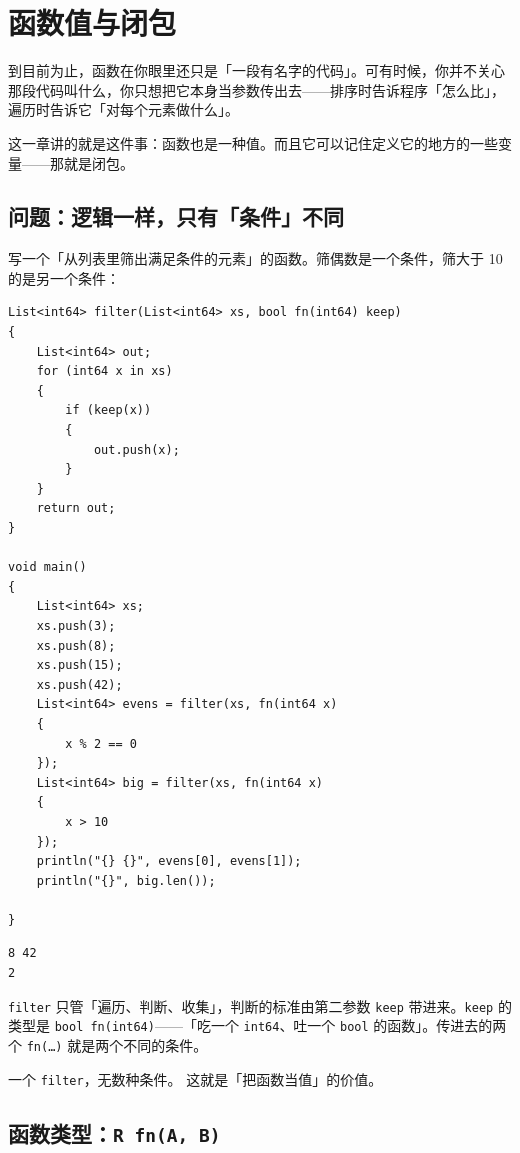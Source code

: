 \chapter{函数值与闭包}
\label{ch:15}

到目前为止，函数在你眼里还只是「一段有名字的代码」。可有时候，你并不关心那段代码叫什么，你只想把它本身当参数传出去——排序时告诉程序「怎么比」，遍历时告诉它「对每个元素做什么」。

这一章讲的就是这件事：函数也是一种值。而且它可以记住定义它的地方的一些变量——那就是闭包。

\section{问题：逻辑一样，只有「条件」不同}

写一个「从列表里筛出满足条件的元素」的函数。筛偶数是一个条件，筛大于 10 的是另一个条件：

\par
\medskip
\begin{lstlisting}[style=chali]
List<int64> filter(List<int64> xs, bool fn(int64) keep)
{
    List<int64> out;
    for (int64 x in xs)
    {
        if (keep(x))
        {
            out.push(x);
        }
    }
    return out;
}

void main()
{
    List<int64> xs;
    xs.push(3);
    xs.push(8);
    xs.push(15);
    xs.push(42);
    List<int64> evens = filter(xs, fn(int64 x)
    {
        x % 2 == 0
    });
    List<int64> big = filter(xs, fn(int64 x)
    {
        x > 10
    });
    println("{} {}", evens[0], evens[1]);
    println("{}", big.len());

}
\end{lstlisting}
\par
\medskip

\par
\medskip
\begin{lstlisting}[style=out]
8 42
2
\end{lstlisting}
\par
\medskip

\texttt{filter} 只管「遍历、判断、收集」，判断的标准由第二参数 \texttt{keep} 带进来。\texttt{keep} 的类型是 \texttt{bool fn(\allowbreak{}int64)\allowbreak{}}——「吃一个 \texttt{int64}、吐一个 \texttt{bool} 的函数」。传进去的两个 \texttt{fn(\allowbreak{}…)\allowbreak{}} 就是两个不同的条件。

一个 \texttt{filter}，无数种条件。 这就是「把函数当值」的价值。

\section{函数类型：\texttt{R fn(\allowbreak{}A,\allowbreak{} B)\allowbreak{}}}

